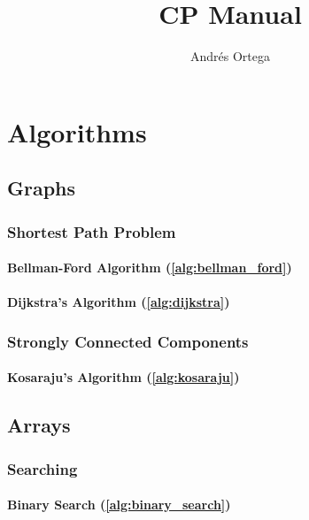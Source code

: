\documentclass[12pt]{book}
\newcommand{\<}{\langle}
\renewcommand{\>}{\rangle}
\renewcommand{\(}{\left(}
\renewcommand{\)}{\right)}
\begin{document}
\title{CP Manual}
\author{Andrés Ortega}
\date{}

\maketitle

\tableofcontents

\chapter{Algorithms}
    \section{Graphs}
        \subsection{Shortest Path Problem}
            \subsubsection{Bellman-Ford Algorithm (\ref{alg:bellman_ford})}
                

            \subsubsection{Dijkstra's Algorithm (\ref{alg:dijkstra})}
                

        \subsection{Strongly Connected Components}
            \subsubsection{Kosaraju's Algorithm (\ref{alg:kosaraju})}
                

    \section{Arrays}
        \subsection{Searching}
            \subsubsection{Binary Search (\ref{alg:binary_search})}
                
\end{document}
